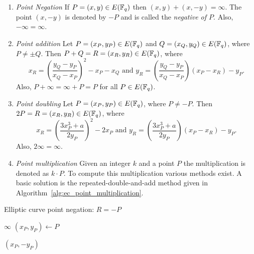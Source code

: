 \begin{enumerate}
  \item \emph{Point Negation}
    If $P = (x, y) \in E(\mathbb{F}_{q})$ then $(x, y) + (x, -y) = \infty$. The point
    $(x, -y)$ is denoted by $-P$ and is called the \emph{negative of $P$}.
    Also, $-\infty = \infty$.
  \item \emph{Point addition}
    Let $P = (x_P, y_P) \in E(\mathbb{F}_{q})$ and $Q = (x_Q, y_Q) \in E(\mathbb{F}_{q})$, where
    $P \neq \pm Q$. Then $P + Q = R = (x_R, y_R) \in E(\mathbb{F}_{q})$, where
    \begin{equation*}
      x_R = \left(\dfrac{y_Q - y_P}{x_Q - x_P}\right)^2 - x_P - x_Q
      \text{ and }
      y_R = \left(\dfrac{y_Q - y_P}{x_Q - x_P}\right) (x_P - x_R) - y_P
      \text{.}
    \end{equation*}
    Also, $P + \infty = \infty + P = P$ for all $P \in E(\mathbb{F}_{q})$.
  \item \emph{Point doubling}
    Let $P = (x_P, y_P) \in E(\mathbb{F}_{q})$, where $P \neq -P$. Then
    $2P = R = (x_R, y_R) \in E(\mathbb{F}_{q})$, where
    \begin{equation*}
      x_R = \left(\dfrac{3 x_P^3 + a}{2 y_P}\right)^2 - 2 x_P
      \text{ and }
      y_R = \left(\dfrac{3 x_P^3 + a}{2 y_P}\right) (x_P - x_R) - y_P
      \text{.}
    \end{equation*}
    Also, $2\infty = \infty$.
  \item \emph{Point multiplication}
    Given an integer $k$ and a point $P$ the multiplication is denoted as
    $k \cdot P$. To compute this multiplication various methods exist. A basic
    solution is the repeated-double-and-add method given in Algorithm~\ref{alg:ec_point_multiplication}.
\end{enumerate}

\begin{algorithm}
  \caption{Elliptic curve point negation: $R = -P$}
  \label{alg:ec_point_negation}

  \begin{algorithmic}[1]
        \Return $\infty$
      \Else
        \State $(x_P, y_P) \gets P$
      \EndIf

      \smallskip
      \Return $(x_P, -y_P)$
    \EndFunction
  \end{algorithmic}
\end{algorithm}


